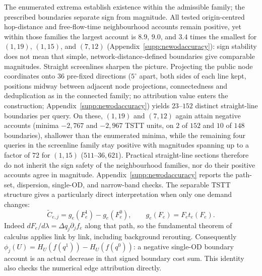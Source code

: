 The enumerated extrema establish existence within the admissible
family; the prescribed boundaries separate sign from magnitude. All
tested origin-centred hop-distance and free-flow-time neighbourhood
accounts remain positive, yet within those families the largest account
is $8.9$, $9.0$, and $3.4$ times the smallest for $(1,19)$, $(1,15)$,
and $(7,12)$ (Appendix~\ref{supp:newodaccuracy}): sign stability does not mean that
simple, network-distance-defined boundaries give comparable magnitudes.
Straight screenlines sharpen the picture. Projecting the public node
coordinates onto $36$ pre-fixed directions ($5^\circ$ apart, both sides
of each line kept, positions midway between adjacent node projections,
connectedness and deduplication as in the connected family; no
attribution value enters the construction;
Appendix~\ref{supp:newodaccuracy}) yields $23$--$152$ distinct
straight-line boundaries per query. On these, $(1,19)$ and $(7,12)$
again attain negative accounts (minima $-2{,}767$ and $-2{,}967$ TSTT
units, on $2$ of $152$ and $10$ of $148$ boundaries), shallower than
the enumerated minima, while the remaining four queries in the screenline family stay
positive with magnitudes spanning up to a factor of $72$ for $(1,15)$
($511$--$36{,}621$). Practical straight-line sections therefore do not
inherit the sign safety of the neighbourhood families, nor do their
positive accounts agree in magnitude. Appendix~\ref{supp:newodaccuracy} reports the path-set, dispersion,
single-OD, and narrow-band checks. The separable TSTT structure gives a
particularly direct interpretation when only one demand changes:
\begin{equation}
\widetilde C_{e,j}=g_e(F_e^1)-g_e(F_e^0),\qquad g_e(F_e)=F_et_e(F_e).
\label{eq:edgeidentity}
\end{equation}
Indeed $dF_e/d\lambda=\Delta q_j\partial_jf_e$ along that path, so the
fundamental theorem of calculus applies link by link, including background
rerouting. Consequently $\phi_j(U)=H_U(f(q^1))-H_U(f(q^0))$: a negative
single-OD boundary account is an actual decrease in that signed boundary
cost sum. This identity also checks the numerical edge attribution directly.

